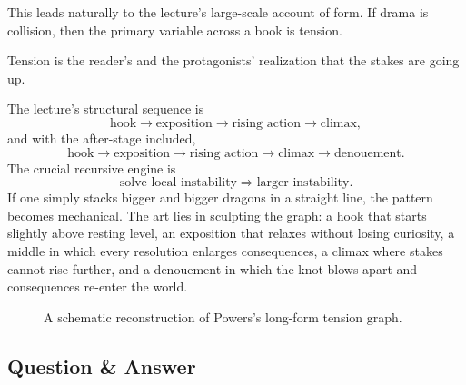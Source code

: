 This leads naturally to the lecture's large-scale account of form. If drama is collision, then the primary variable across a book is tension.

\begin{definition}
Tension is the reader's and the protagonists' realization that the stakes are going up.
\end{definition}

The lecture's structural sequence is
\begin{equation}
\text{hook} \to \text{exposition} \to \text{rising action} \to \text{climax},
\end{equation}
and with the after-stage included,
\begin{equation}
\text{hook} \to \text{exposition} \to \text{rising action} \to \text{climax} \to \text{denouement}.
\end{equation}
The crucial recursive engine is
\begin{equation}
\text{solve local instability} \Rightarrow \text{larger instability}.
\end{equation}
If one simply stacks bigger and bigger dragons in a straight line, the pattern becomes mechanical. The art lies in sculpting the graph: a hook that starts slightly above resting level, an exposition that relaxes without losing curiosity, a middle in which every resolution enlarges consequences, a climax where stakes cannot rise further, and a denouement in which the knot blows apart and consequences re-enter the world.

\begin{figure}[h]
\centering
{}
\caption{A schematic reconstruction of Powers's long-form tension graph.}
\end{figure}

\subsection{Question \& Answer}

